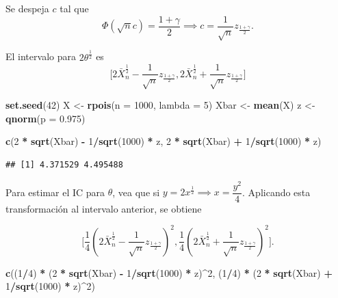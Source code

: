 \documentclass[
  12pt,
]{book}
\newenvironment{Shaded}{\begin{snugshade}}{\end{snugshade}}
\newcommand{\DataTypeTok}[1]{\textcolor[rgb]{0.13,0.29,0.53}{#1}}
\newcommand{\DecValTok}[1]{\textcolor[rgb]{0.00,0.00,0.81}{#1}}
\newcommand{\FloatTok}[1]{\textcolor[rgb]{0.00,0.00,0.81}{#1}}
\newcommand{\KeywordTok}[1]{\textcolor[rgb]{0.13,0.29,0.53}{\textbf{#1}}}
\newcommand{\NormalTok}[1]{#1}
\newcommand{\OperatorTok}[1]{\textcolor[rgb]{0.81,0.36,0.00}{\textbf{#1}}}
\newcommand{\StringTok}[1]{\textcolor[rgb]{0.31,0.60,0.02}{#1}}
\begin{document}
Se despeja \(c\) tal que \[\Phi(\sqrt n c) = \dfrac{1+\gamma}2\implies c = \dfrac 1{\sqrt
n} z_{\frac{1+\gamma}2}.\]

El intervalo para \(2\theta^{\frac 12}\) es \[\bigg[2\bar X_n^{\frac 12} -\dfrac
1{\sqrt n} z_{\frac{1+\gamma}2},2\bar X_n^{\frac 12} +\dfrac 1{\sqrt n}
z_{\frac{1+\gamma}2}\bigg]\]

\begin{Shaded}
\begin{Highlighting}[]
\KeywordTok{set.seed}\NormalTok{(}\DecValTok{42}\NormalTok{)}
\NormalTok{X \textless{}{-}}\StringTok{ }\KeywordTok{rpois}\NormalTok{(}\DataTypeTok{n =} \DecValTok{1000}\NormalTok{, }\DataTypeTok{lambda =} \DecValTok{5}\NormalTok{)}
\NormalTok{Xbar \textless{}{-}}\StringTok{ }\KeywordTok{mean}\NormalTok{(X)}
\NormalTok{z \textless{}{-}}\StringTok{ }\KeywordTok{qnorm}\NormalTok{(}\DataTypeTok{p =} \FloatTok{0.975}\NormalTok{)}

\KeywordTok{c}\NormalTok{(}\DecValTok{2} \OperatorTok{*}\StringTok{ }\KeywordTok{sqrt}\NormalTok{(Xbar) }\OperatorTok{{-}}\StringTok{ }\DecValTok{1}\OperatorTok{/}\KeywordTok{sqrt}\NormalTok{(}\DecValTok{1000}\NormalTok{) }\OperatorTok{*}\StringTok{ }\NormalTok{z, }\DecValTok{2} \OperatorTok{*}\StringTok{ }\KeywordTok{sqrt}\NormalTok{(Xbar) }\OperatorTok{+}\StringTok{ }
\StringTok{    }\DecValTok{1}\OperatorTok{/}\KeywordTok{sqrt}\NormalTok{(}\DecValTok{1000}\NormalTok{) }\OperatorTok{*}\StringTok{ }\NormalTok{z)}
\end{Highlighting}
\end{Shaded}

\begin{verbatim}
## [1] 4.371529 4.495488
\end{verbatim}

Para estimar el IC para \(\theta\), vea que si \(y=2x^{\frac12} \implies x = \dfrac{y^2}{4}\). Aplicando esta transformación al intervalo anterior, se obtiene

\[\bigg[\dfrac 14 \left(2\bar X_n^{\frac 12} -\dfrac 1{\sqrt n}
z_{\frac{1+\gamma}2}\right)^2,\dfrac 14 \left(2\bar X_n^{\frac 12} +\dfrac 1{\sqrt n}
z_{\frac{1+\gamma}2}\right)^2\bigg].\]

\begin{Shaded}
\begin{Highlighting}[]
\KeywordTok{c}\NormalTok{((}\DecValTok{1}\OperatorTok{/}\DecValTok{4}\NormalTok{) }\OperatorTok{*}\StringTok{ }\NormalTok{(}\DecValTok{2} \OperatorTok{*}\StringTok{ }\KeywordTok{sqrt}\NormalTok{(Xbar) }\OperatorTok{{-}}\StringTok{ }\DecValTok{1}\OperatorTok{/}\KeywordTok{sqrt}\NormalTok{(}\DecValTok{1000}\NormalTok{) }\OperatorTok{*}\StringTok{ }\NormalTok{z)}\OperatorTok{\^{}}\DecValTok{2}\NormalTok{, (}\DecValTok{1}\OperatorTok{/}\DecValTok{4}\NormalTok{) }\OperatorTok{*}\StringTok{ }
\StringTok{    }\NormalTok{(}\DecValTok{2} \OperatorTok{*}\StringTok{ }\KeywordTok{sqrt}\NormalTok{(Xbar) }\OperatorTok{+}\StringTok{ }\DecValTok{1}\OperatorTok{/}\KeywordTok{sqrt}\NormalTok{(}\DecValTok{1000}\NormalTok{) }\OperatorTok{*}\StringTok{ }\NormalTok{z)}\OperatorTok{\^{}}\DecValTok{2}\NormalTok{)}
\end{Highlighting}
\end{Shaded}
\end{document}
